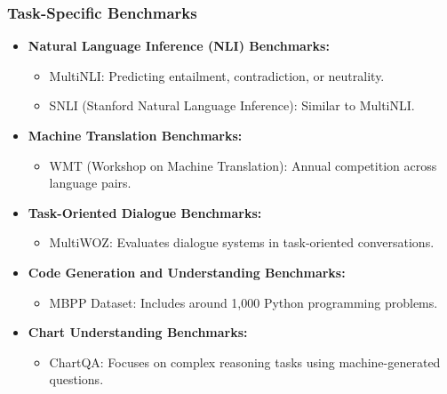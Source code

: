 \begin{frame}[fragile]\frametitle{Task-Specific Benchmarks}
  \begin{itemize}
    \item \textbf{Natural Language Inference (NLI) Benchmarks:}
      \begin{itemize}
        \item MultiNLI: Predicting entailment, contradiction, or neutrality.
        \item SNLI (Stanford Natural Language Inference): Similar to MultiNLI.
      \end{itemize}
    \item \textbf{Machine Translation Benchmarks:}
      \begin{itemize}
        \item WMT (Workshop on Machine Translation): Annual competition across language pairs.
      \end{itemize}
    \item \textbf{Task-Oriented Dialogue Benchmarks:}
      \begin{itemize}
        \item MultiWOZ: Evaluates dialogue systems in task-oriented conversations.
      \end{itemize}
    \item \textbf{Code Generation and Understanding Benchmarks:}
      \begin{itemize}
        \item MBPP Dataset: Includes around 1,000 Python programming problems.
      \end{itemize}
    \item \textbf{Chart Understanding Benchmarks:}
      \begin{itemize}
        \item ChartQA: Focuses on complex reasoning tasks using machine-generated questions.
      \end{itemize}
  \end{itemize}
\end{frame}



